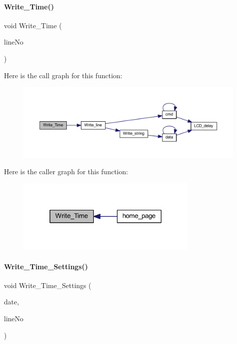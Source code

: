 \paragraph{Write\+\_\+\+Time()}
{\footnotesize\ttfamily void Write\+\_\+\+Time (\begin{DoxyParamCaption}\item[{int}]{line\+No }\end{DoxyParamCaption})}

Here is the call graph for this function\+:
\nopagebreak
\begin{figure}[H]
\begin{center}
\leavevmode
\includegraphics[width=350pt]{a00032_a56e791a9efe9fd411e81433c290b733e_cgraph}
\end{center}
\end{figure}
Here is the caller graph for this function\+:
\nopagebreak
\begin{figure}[H]
\begin{center}
\leavevmode
\includegraphics[width=249pt]{a00032_a56e791a9efe9fd411e81433c290b733e_icgraph}
\end{center}
\end{figure}
\mbox{\label{a00032_aaa71cdb88431591180cebebb47616028}} 
\paragraph{Write\+\_\+\+Time\+\_\+\+Settings()}
{\footnotesize\ttfamily void Write\+\_\+\+Time\+\_\+\+Settings (\begin{DoxyParamCaption}\item[{\textbf{ Date\+Time}}]{date,  }\item[{int}]{line\+No }\end{DoxyParamCaption})}

